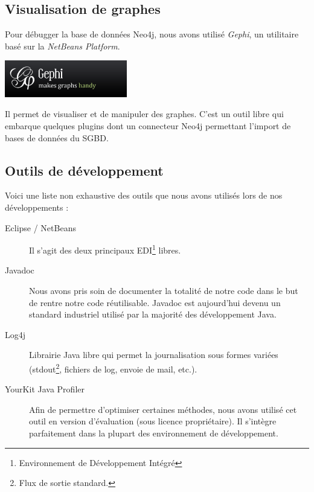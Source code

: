 \subsection{Visualisation de graphes}

Pour débugger la base de données Neo4j, nous avons utilisé \emph{Gephi}, un utilitaire basé sur la \emph{NetBeans Platform}.

\begin{center}
\includegraphics[width=0.4\textwidth]{files/outils/gephi}
\end{center}

Il permet de visualiser et de manipuler des graphes. C'est un outil libre qui embarque quelques plugins dont un connecteur Neo4j permettant l'import de bases de données du SGBD.

\subsection{Outils de développement}
Voici une liste non exhaustive des outils que nous avons utilisés lors de nos développements :
\begin{description}
\item[Eclipse / NetBeans] Il s'agit des deux principaux EDI\footnote{Environnement de Développement Intégré} libres.
\item[Javadoc] Nous avons pris soin de documenter la totalité de notre code dans le but de rentre notre code réutilisable. Javadoc est aujourd'hui devenu un standard industriel utilisé par la majorité des développement Java.
\item[Log4j] Librairie Java libre qui permet la journalisation sous formes variées (stdout\footnote{Flux de sortie standard.}, fichiers de log, envoie de mail, etc.).
\item[YourKit Java Profiler] Afin de permettre d'optimiser certaines méthodes, nous avons utilisé cet outil en version d'évaluation (sous licence propriétaire). Il s'intègre parfaitement dans la plupart des environnement de développement.
\end{description}